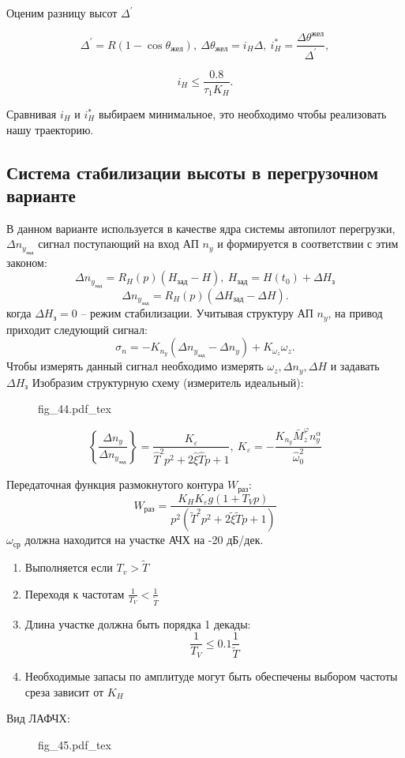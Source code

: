 \documentclass{article}
\newcommand{\incfig}[1]{
    {#1.pdf_tex}
}
\begin{document}
Оценим разницу высот $\Delta^{'}$

\[
	\Delta^{'} = R(1 - \cos{\theta_\text{жел}}), \ \Delta \theta_\text{жел} = i_H \Delta, \ i_{H}^* = \frac{\Delta \theta^\text{жел}}{\Delta^{'}},
\]

\[
	i_H \le \frac{0.8}{\tau_1 K_H}
	.\]

Сравнивая $i_H$ и $i_H^*$ выбираем минимальное, это необходимо чтобы реализовать нашу траекторию.

\subsection{Система стабилизации высоты в перегрузочном варианте}
В данном варианте используется в качестве ядра системы автопилот перегрузки, $ \Delta n_{y_\text{зад}}$ сигнал поступающий на вход АП $n_y$ и формируется в соответствии с этим законом:
\[
	\Delta n_{y_\text{зад}} = R_H(p) (H_\text{зад} - H), \ H_\text{зад} = H(t_0) + \Delta H_\text{з}
\]
\[
	\Delta n_{y_\text{зад}} = R_H(p) (\Delta H_\text{зад} - \Delta H)
	.\]
когда $\Delta H_\text{з} = 0$ -- режим стабилизации. Учитывая структуру АП $n_y$, на привод приходит следующий сигнал:
\[
	\sigma_n = -K_{n_y} ( \Delta n_{y_\text{зад}} - \Delta n_y) + K_{\omega_z} \omega_z
	.\]
Чтобы измерять данный сигнал необходимо измерять $\omega_z, \Delta n_y, \Delta H$ и задавать $\Delta H_\text{з}$
Изобразим структурную схему (измеритель идеальный):
\begin{figure}[H]
	\centering
	\incfig{fig_44}
	\label{fig:fig_44}
\end{figure}
\[
	\left\{ \frac{ \Delta n_y}{ \Delta n_{y_\text{зад}}} \right\}  = \frac{K_\varepsilon}{ \hat{T}^2 p^2 + 2 \hat{\xi} \hat{T}p + 1 }, \ K_\varepsilon = - \frac{K_{n_y} \bar{M}_z^{\varphi} n_y^\alpha }{\hat{\omega}_0^2}
\]

Передаточная функция размокнутого контура $W_\text{раз}$:
\[
	W_\text{раз}  = \frac{K_H K_\varepsilon g (1 + T_V p)}{p^2 (\tilde{T}^2 p^2 + 2 \tilde{\xi} \tilde{T}p + 1)}
\]
$\omega_\text{ср}$ должна находится на участке АЧХ на -20 дБ/дек.
\begin{enumerate}
	\item Выполняется если $T_v > \tilde{T}$
	\item Переходя к частотам $\frac{1}{T_V} < \frac{1}{\tilde{T}}$
	\item Длина участке должна быть порядка 1 декады:
	      \[
		      \frac{1}{T_V} \le 0.1 \frac{1}{\tilde{T}}
	      \]
	\item Необходимые запасы по амплитуде могут быть обеспечены выбором частоты среза зависит от $K_H$
\end{enumerate}
Вид ЛАФЧХ:
\begin{figure}[H]
	\centering
	\incfig{fig_45}
	\label{fig:fig_45}
\end{figure}
\end{document}

